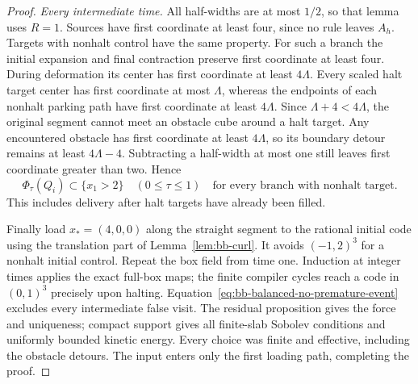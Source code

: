 \begin{proof}
\emph{Every intermediate time.}
All half-widths are at most $1/2$, so that lemma uses $R=1$.
Sources have first coordinate at least four, since no rule leaves
$A_h$.  Targets with nonhalt control have the same property.
For such a branch the initial expansion and final contraction preserve
first coordinate at least four.  During deformation its center has
first coordinate at least $4\Lambda$.  Every scaled halt target
center has first coordinate at most $\Lambda$, whereas the endpoints
of each nonhalt parking path have first coordinate at least
$4\Lambda$.  Since $\Lambda+4<4\Lambda$, the original segment
cannot meet an obstacle cube around a halt target.  Any encountered
obstacle has first coordinate at least $4\Lambda$, so its boundary
detour remains at least $4\Lambda-4$.  Subtracting a half-width at
most one still leaves first coordinate greater than two.  Hence
\begin{equation}\label{eq:bb-balanced-no-premature-event}
 \Phi_\tau(Q_i)\subset\{x_1>2\}\quad(0\le\tau\le1)
 \quad\text{for every branch with nonhalt target}.
\end{equation}
This includes delivery after halt targets have already been filled.

Finally load $x_*=(4,0,0)$ along the straight segment to the rational
initial code using the translation part of Lemma~\ref{lem:bb-curl}.
It avoids $(-1,2)^3$ for a nonhalt initial control.  Repeat the box
field from time one.  Induction at integer times applies the exact
full-box maps; the finite compiler cycles reach a code in $(0,1)^3$
precisely upon halting.  Equation~\eqref{eq:bb-balanced-no-premature-event}
excludes every intermediate false visit.  The residual proposition
gives the force and uniqueness; compact support gives all finite-slab
Sobolev conditions and uniformly bounded kinetic energy.  Every choice
was finite and effective, including the obstacle detours.  The input
enters only the first loading path, completing the proof.
\end{proof}

